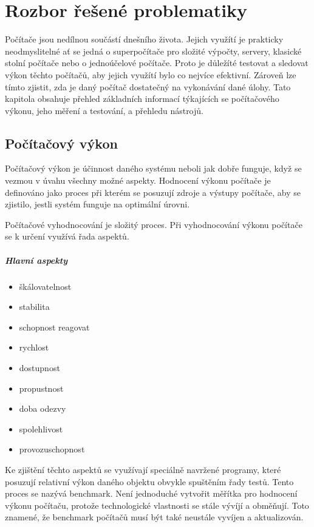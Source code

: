 \chapter{Rozbor řešené problematiky}
\label{sec:RozborReseneProblematiky}

Počítače jsou nedílnou součástí dnešního života. Jejich využítí je prakticky neodmyslitelné ať se jedná o superpočítače pro složité výpočty, servery, klasické stolní počítače nebo o jednoúčelové počítače. Proto je důležíté testovat a sledovat výkon těchto počítačů, aby jejich využítí bylo co nejvíce efektivní. Zároveň lze tímto zjistit, zda je daný počítač dostatečný na vykonávání dané úlohy. Tato kapitola obsahuje přehled základních informací týkajících se počítačového výkonu, jeho měření a testování, a přehledu nástrojů.


\section{Počítačový výkon}
Počítačový výkon je účinnost daného systému neboli jak dobře funguje, když se vezmou v úvahu všechny možné aspekty.
Hodnocení výkonu počítače je definováno jako proces při kterém se posuzují zdroje a výstupy počítače, aby se zjistilo,
jestli systém funguje na optimální úrovni.

Počítačové vyhodnocování je složitý proces. Při vyhodnocování výkonu počítače se k určení využívá řada aspektů.
\paragraph{Hlavní aspekty}\cite{MetricsToday}
\begin{itemize}[noitemsep]
    \item{škálovatelnost}
    \item{stabilita}
    \item{schopnost reagovat}
    \item{rychlost}
    \item{dostupnost}
    \item{propustnost}
    \item{doba odezvy}
    \item{spolehlivost}
    \item{provozuschopnost}
\end{itemize}

Ke zjištění těchto aspektů se využívají speciálně navržené programy, které posuzují relativní výkon daného objektu obvykle spuštěním řady testů.
Tento proces se nazývá benchmark. Není jednoduché vytvořit měřítka pro hodnocení výkonu počítaču, protože technologické vlastnosti se stále vývíjí a obměňují.
Toto znamené, že benchmark počítačů musí být také neustále vyvíjen a aktualizován.

